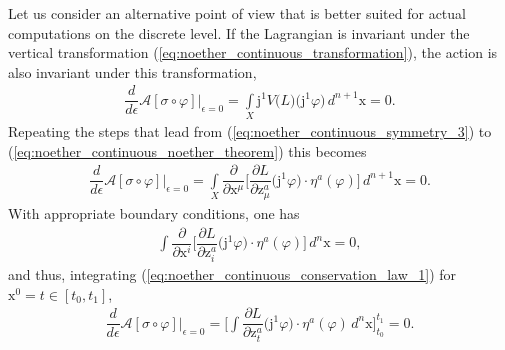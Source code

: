 \documentclass[12pt,a4paper,reqno]{article}
\begin{document}
Let us consider an alternative point of view that is better suited for actual computations on the discrete level.
If the Lagrangian is invariant under the vertical transformation (\ref{eq:noether_continuous_transformation}), the action is also invariant under this transformation,
\begin{align}\label{eq:noether_continuous_global_invariance_condition}
\dfrac{d}{d{\ensuremath{\epsilon}}} \mathcal{A} [\sigma \circ {\ensuremath{\varphi}}] \bigg\vert_{{\ensuremath{\epsilon}}=0}
= \int \limits_{X} {\ensuremath{\mathrm{j}}}^{1} V \big( L \big) \big( {\ensuremath{\mathrm{j}}}^{1} {\ensuremath{\varphi}} \big) \, d^{n+1} {\ensuremath{{\ensuremath{\mathrm{{x}}}}}}
= 0 .
\end{align}
Repeating the steps that lead from (\ref{eq:noether_continuous_symmetry_3}) to (\ref{eq:noether_continuous_noether_theorem}) this becomes
\begin{align}\label{eq:noether_continuous_conservation_law_1}
\dfrac{d}{d{\ensuremath{\epsilon}}} \mathcal{A} [\sigma \circ {\ensuremath{\varphi}}] \bigg\vert_{{\ensuremath{\epsilon}}=0}
= \int \limits_{X} \dfrac{\partial}{\partial {\ensuremath{{\ensuremath{\mathrm{{x}}}}}}^{\mu}} \bigg[ \dfrac{\partial L}{\partial {\ensuremath{{\ensuremath{\mathrm{{z}}}}}}^{a}_{\mu}} \big( {\ensuremath{\mathrm{j}}}^{1} {\ensuremath{\varphi}} \big) \cdot \eta^{a} ({\ensuremath{\varphi}}) \bigg] \, d^{n+1} {\ensuremath{{\ensuremath{\mathrm{{x}}}}}}
= 0 .
\end{align}
With appropriate boundary conditions, one has
\begin{align}\label{eq:noether_continuous_current_spatial_integral}
\int \dfrac{\partial}{\partial {\ensuremath{{\ensuremath{\mathrm{{x}}}}}}^{i}} \bigg[ \dfrac{\partial L}{\partial {\ensuremath{{\ensuremath{\mathrm{{z}}}}}}^{a}_{i}} \big( {\ensuremath{\mathrm{j}}}^{1} {\ensuremath{\varphi}} \big) \cdot \eta^{a} ({\ensuremath{\varphi}}) \bigg] \, d^{n} {\ensuremath{{\ensuremath{\mathrm{{x}}}}}} = 0 ,
\end{align}
and thus, integrating (\ref{eq:noether_continuous_conservation_law_1}) for ${\ensuremath{{\ensuremath{\mathrm{{x}}}}}}^{0} = {\ensuremath{{\ensuremath{{t}}}}} \in [t_{0}, t_{1}]$,
\begin{align}\label{eq:noether_continuous_conservation_law_2}
\dfrac{d}{d{\ensuremath{\epsilon}}} \mathcal{A} [\sigma \circ {\ensuremath{\varphi}}] \bigg\vert_{{\ensuremath{\epsilon}}=0}
= \bigg[ \int \dfrac{\partial L}{\partial {\ensuremath{{\ensuremath{\mathrm{{z}}}}}}^{a}_{t}} \big( {\ensuremath{\mathrm{j}}}^{1} {\ensuremath{\varphi}} \big) \cdot \eta^{a} ({\ensuremath{\varphi}}) \, d^{n} {\ensuremath{{\ensuremath{\mathrm{{x}}}}}} \bigg]_{t_{0}}^{t_{1}}
= 0 .
\end{align}
\end{document}
